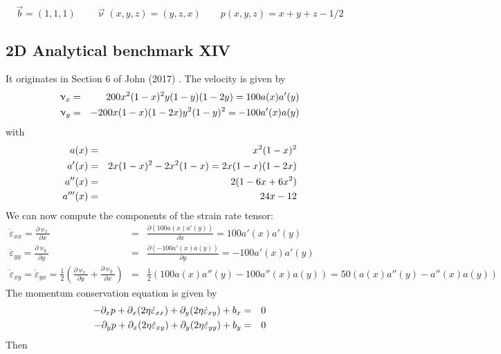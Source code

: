 \[
\vec{b} = (1,1,1)
\qquad
\vec{\upnu}(x,y,z)=(y,z,x)
\qquad
p(x,y,z)=x+y+z-1/2
\]

\subsection{2D Analytical benchmark XIV\label{ss:mmsjolm17}}

It originates in Section 6 of John \etal (2017) \cite{jolm17}.
The velocity is given by
\begin{eqnarray}
\upnu_x &=&200 x^2(1-x)^2 y (1-y)(1-2y) = 100 a(x) a'(y) \nonumber\\
\upnu_y &=& - 200 x(1-x)(1-2x)y^2(1-y)^2 = -100 a'(x) a(y) \nonumber
\end{eqnarray}
with 
\begin{eqnarray}
a(x)  &=& x^2(1-x)^2 \nonumber\\
a'(x) &=& 2x(1-x)^2-2x^2(1-x) = 2x(1-x)(1-2x) \nonumber\\
a''(x) &=& 2(1-6x+6x^2) \nonumber\\
a'''(x) &=& 24x-12 \nonumber
\end{eqnarray}
We can now compute the components of the strain rate tensor:
\begin{eqnarray}
\dot{\varepsilon}_{xx}=
\frac{\partial \upnu_x}{\partial x}
&=&\frac{\partial  (100 a(x)a'(y))}{\partial x} =
100 a'(x)a'(y) \nonumber\\
\dot{\varepsilon}_{yy}=
\frac{\partial \upnu_y}{\partial y}
&=& \frac{\partial (-100 a'(x) a(y))}{\partial y}
= -100 a'(x)a'(y) \nonumber\\
\dot{\varepsilon}_{xy}=
\dot{\varepsilon}_{yx}=
\frac12 \left( \frac{\partial \upnu_x}{\partial y}
+\frac{\partial \upnu_y}{\partial x} \right) &=& 
\frac12 \left(100 a(x)a''(y) -100 a''(x) a(y) \right) 
= 50 \left( a(x)a''(y) - a''(x) a(y) \right)
\nonumber
\end{eqnarray}
The momentum conservation equation is given by
\begin{eqnarray}
- \partial_x p + \partial_x (2\eta \dot{\varepsilon}_{xx})
+ \partial_y (2\eta \dot{\varepsilon}_{xy}) + b_x &=&0 \nonumber\\
- \partial_y p + \partial_x (2\eta \dot{\varepsilon}_{xy})
+ \partial_y (2\eta \dot{\varepsilon}_{yy}) + b_y &=&0 \nonumber
\end{eqnarray}
Then 
